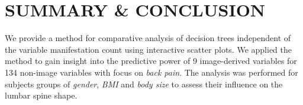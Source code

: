 \documentclass[a4paper,twoside]{style/article}
\begin{document}
\section{\uppercase{Summary \& Conclusion}}
\label{sec:Conclusion}
\noindent We provide a method for comparative analysis of decision trees independent of the variable manifestation count using interactive scatter plots.
We applied the method to gain insight into the predictive power of 9 image-derived variables for 134 non-image variables with focus on \emph{back pain}.
The analysis was performed for subjects groups of \emph{gender}, \emph{BMI} and \emph{body size} to assess their influence on the lumbar spine shape.
\end{document}
